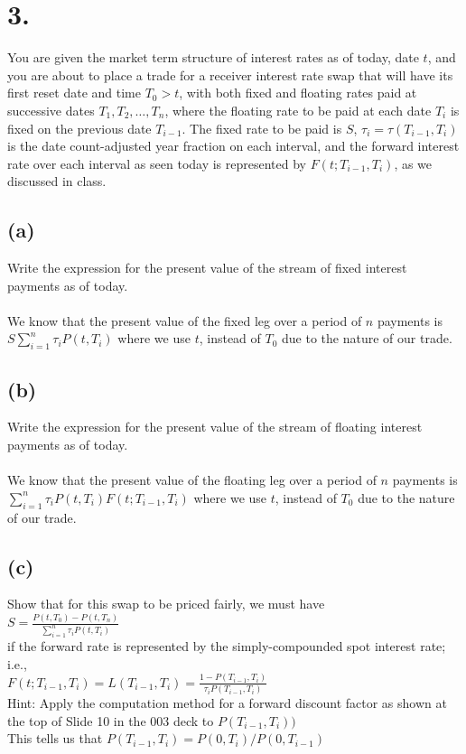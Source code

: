 \documentclass{article}
\begin{document}
\section*{3.}
{\Large 

You are given the market term structure of interest rates as of today, date $t$, and you are about to place a trade for a receiver interest rate swap that will have its first reset date and time $T_0 > t$, with both fixed and floating rates paid at successive dates $T_1, T_2, \dots, T_n$, where the floating rate to be paid at each date $T_i$ is fixed on the previous date $T_{i-1}$. The fixed rate to be paid is $S$, $\tau_i = \tau(T_{i-1}, T_i)$ is the date count-adjusted year fraction on each interval, and the forward interest rate over each interval as seen today is represented by $F(t; T_{i-1}, T_i)$, as we discussed in class.

\subsection*{(a)}

Write the expression for the present value of the stream of fixed interest payments as of today. \\ \\
We know that the present value of the fixed leg over a period of $n$ payments is $S\sum_{i=1}^{n} \tau_i P(t, T_i)$ where we use $t$, instead of $T_0$ due to the nature of our trade. 

\subsection*{(b)}

Write the expression for the present value of the stream of floating interest payments as of today. \\ \\
We know that the present value of the floating leg over a period of $n$ payments is $\sum_{i=1}^{n} \tau_i P(t, T_i)F(t; T_{i-1}, T_i)$ where we use $t$, instead of $T_0$ due to the nature of our trade. 

\subsection*{(c)}

Show that for this swap to be priced fairly, we must have \\
$S = \frac{P(t, T_0) - P(t, T_n)}{\sum_{i=1}^{n}\tau_iP(t, T_i)}$ \\ 
if the forward rate is represented by the simply-compounded spot interest rate; i.e., \\ 
$F(t; T_{i-1}, T_i) = L(T_{i-1}, T_i) = \frac{1-P(T_{i-1}, T_i)}{\tau_iP(T_{i-1}, T_i)}$ \\ 
Hint: Apply the computation method for a forward discount factor as shown at the top of Slide 10 in the 003 deck to $P(T_{i-1}, T_{i}))$ \\
This tells us that $P(T_{i-1}, T_i) = P(0, T_i) / P(0, T_{i-1})$\\ \\ 

}
\end{document}
